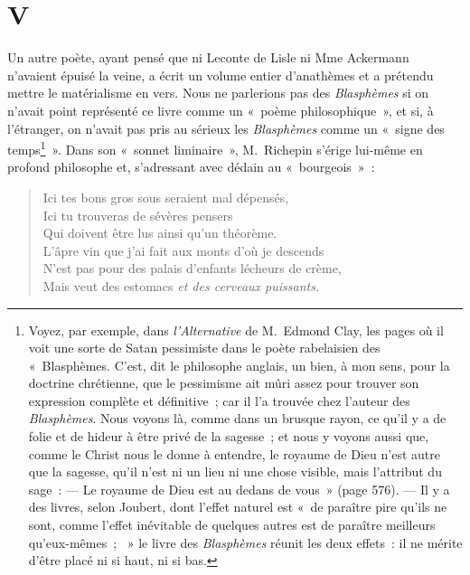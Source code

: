 \documentclass[french,twoside]{book} %
\begin{document}
\section[{V}]{V}
\noindent Un autre poète, ayant pensé que ni Leconte de Lisle ni Mme Ackermann n’avaient épuisé la veine, a écrit un volume entier d’anathèmes et a prétendu mettre le matérialisme en vers. Nous ne parlerions pas des \emph{Blasphèmes} si on n’avait point représenté ce livre comme un « poème philosophique », et si, à l’étranger, on n’avait pas pris au sérieux les \emph{Blasphèmes} comme un « signe des temps\footnote{ Voyez, par exemple, dans \emph{l’Alternative} de M. Edmond Clay, les pages où il voit une sorte de Satan pessimiste dans le poète rabelaisien des « Blasphèmes. C’est, dit le philosophe anglais, un bien, à mon sens, pour la doctrine chrétienne, que le pessimisme ait mûri assez pour trouver son expression complète et définitive ; car il l’a trouvée chez l’auteur des \emph{Blasphèmes}. Nous voyons là, comme dans un brusque rayon, ce qu’il y a de folie et de hideur à être privé de la sagesse ; et nous y voyons aussi que, comme le Christ nous le donne à entendre, le royaume de Dieu n’est autre que la sagesse, qu’il n’est ni un lieu ni une chose visible, mais l’attribut du sage : — Le royaume de Dieu est au dedans de vous » (page 576). — Il y a des livres, selon Joubert, dont l’effet naturel est « de paraître pire qu’ils ne sont, comme l’effet inévitable de quelques autres est de paraître meilleurs qu’eux-mêmes ;  » le livre des \emph{Blasphèmes} réunit les deux effets : il ne mérite d’être placé ni si haut, ni si bas.} ». Dans son « sonnet liminaire », M. Richepin s’érige lui-même en profond philosophe et, s’adressant avec dédain au « bourgeois » :\par


\begin{verse}
Ici tes bons gros sous seraient mal dépensés,\\
Ici tu trouveras de sévères pensers\\
Qui doivent être lus ainsi qu’un théorème.\\
L’âpre vin que j’ai fait aux monts d’où je descends\\
N’est pas pour des palais d’enfants lécheurs de crème,\\
Mais veut des estomacs \emph{et des cerveaux puissants.}\\
\end{verse}
\end{document}
